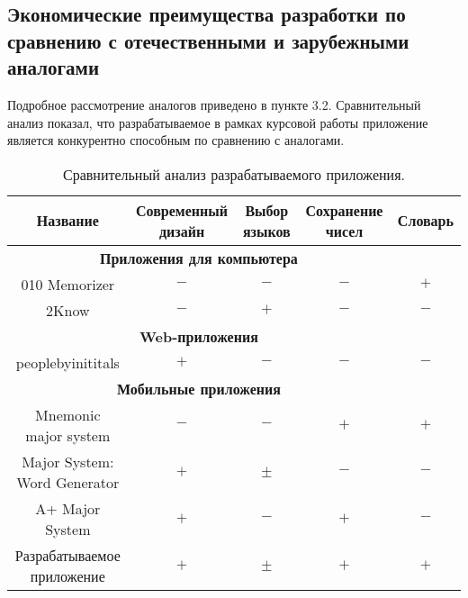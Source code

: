 \documentclass[draft]{article}
\begin{document}
\subsection{Экономические преимущества разработки по сравнению с отечественными и
зарубежными аналогами}
Подробное рассмотрение аналогов приведено в пункте 3.2. Сравнительный анализ показал, что разрабатываемое в рамках курсовой работы приложение является конкурентно способным по сравнению с аналогами.
\begin{table}[H]
\caption{\label{tab:canonsummary}Сравнительный анализ разрабатываемого приложения.}
\begin{center}
\begin{tabular}{|c|c|c|c|c|}
\hline
\textbf{Название} & \textbf{Современный дизайн} & \textbf{Выбор языков} & \textbf{Сохранение чисел} & \textbf{Словарь}\\
\hline
\multicolumn{4}{|c|}{\textbf{Приложения для компьютера}} \\
\hline
010 Memorizer
& $-$
& $-$
& $-$
& $+$ \\
\hline
2Know
& $-$
& $+$
& $-$
& $-$ \\
\hline
\multicolumn{4}{|c|}{\textbf{Web-приложения}} \\
\hline
peoplebyinititals
& $+$
& $-$
& $-$
& $-$ \\
\hline
\multicolumn{4}{|c|}{\textbf{Мобильные приложения}} \\
\hline
Mnemonic major system
& $-$
& $-$
& $+$
& $+$ \\
\hline
Major System: Word Generator
& $+$
& $\pm$
& $-$
& $-$ \\
\hline
A+ Major System
& $+$
& $-$
& $+$
& $-$ \\
\hline
Разрабатываемое приложение
& $+$
& $\pm$
& $+$
& $+$ \\
\hline
\end{tabular}
\end{center}
\end{table} 
\newpage
{}
\end{document}
